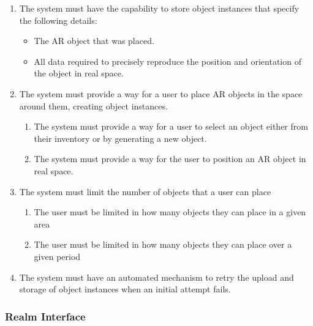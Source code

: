 \documentclass{article}
\begin{document}
\begin{enumerate}[align=left, label=\textbf{OP-FR\arabic*:}]
    \item The system must have the capability to store object instances that specify the following details:
          \begin{itemize}
              \item The AR object that was placed.
              \item All data required to precisely reproduce the position and orientation of the object in real space.
          \end{itemize}

    \item The system must provide a way for a user to place AR objects in the space around them, creating object instances.
          \begin{enumerate}[align=left, label=\textbf{OP-FR2.\arabic*:}]
              \item The system must provide a way for a user to select an object either from their inventory or by generating a new object.
              \item The system must provide a way for the user to position an AR object in real space.
          \end{enumerate}

    \item The system must limit the number of objects that a user can place
          \begin{enumerate}[align=left, label=\textbf{OP-FR3.\arabic*:}]
              \item The user must be limited in how many objects they can place in a given area
              \item The user must be limited in how many objects they can place over a given period
          \end{enumerate}

    \item The system must have an automated mechanism to retry the upload and storage of object instances when an initial attempt fails. \\
\end{enumerate}

\subsubsection{Realm Interface}
\label{ssub:realm_interface}
\end{document}
